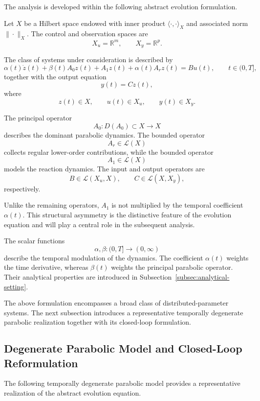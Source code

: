 \documentclass[pdflatex,sn-mathphys-num]{sn-jnl}
\theoremstyle{thmstyleone}%
\theoremstyle{thmstyletwo}%
\theoremstyle{thmstylethree}%
\begin{document}
The analysis is developed within the following abstract evolution formulation.

Let \(X\) be a Hilbert space endowed with inner product \(\langle\cdot,\cdot\rangle_X\) and associated norm \(\|\cdot\|_X\).
The control and observation spaces are
\[
X_u=\mathbb{R}^{m},
\qquad
X_y=\mathbb{R}^{p}.
\]

The class of systems under consideration is described by
\begin{equation}
\alpha(t)\dot z(t)
+
\beta(t)A_0z(t)
+
A_1z(t)
+
\alpha(t)A_rz(t)
=
Bu(t),
\qquad
t\in(0,T],
\label{eq:abstract-system}
\end{equation}
together with the output equation
\begin{equation}
y(t)=Cz(t),
\label{eq:abstract-output}
\end{equation}
where
\[
z(t)\in X,
\qquad
u(t)\in X_u,
\qquad
y(t)\in X_y.
\]

The principal operator
\[
A_0:D(A_0)\subset X\rightarrow X
\]
describes the dominant parabolic dynamics. The bounded operator
\[
A_r\in\mathcal L(X)
\]
collects regular lower-order contributions, while the bounded operator
\[
A_1\in\mathcal L(X)
\]
models the reaction dynamics. The input and output operators are
\[
B\in\mathcal L(X_u,X),
\qquad
C\in\mathcal L(X,X_y),
\]
respectively.

Unlike the remaining operators, \(A_1\) is not multiplied by the temporal coefficient \(\alpha(t)\).
This structural asymmetry is the distinctive feature of the evolution equation and will play a central role in the subsequent analysis.

The scalar functions
\[
\alpha,\beta:(0,T]\rightarrow(0,\infty)
\]
describe the temporal modulation of the dynamics. The coefficient \(\alpha(t)\) weights the time derivative, whereas \(\beta(t)\) weights the principal parabolic operator. Their analytical properties are introduced in Subsection~\ref{subsec:analytical-setting}.

The above formulation encompasses a broad class of distributed-parameter systems. The next subsection introduces a representative temporally degenerate parabolic realization together with its closed-loop formulation.


\subsection{Degenerate Parabolic Model and Closed-Loop Reformulation}
\label{subsec:parabolic-model}

The following temporally degenerate parabolic model provides a representative realization of the abstract evolution equation.
\end{document}
